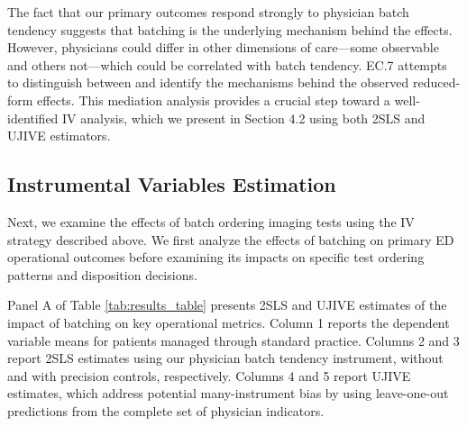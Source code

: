 \documentclass[,,blindrev]{informs}
\begin{document}
The fact that our primary outcomes respond strongly to physician batch
tendency suggests that batching is the underlying mechanism behind the
effects. However, physicians could differ in other dimensions of
care---some observable and others not---which could be correlated with
batch tendency. EC.7 attempts to distinguish between and identify the
mechanisms behind the observed reduced-form effects. This mediation
analysis provides a crucial step toward a well-identified IV analysis,
which we present in Section 4.2 using both 2SLS and UJIVE estimators.

\subsection{Instrumental Variables Estimation}\label{sec:iv_results}

Next, we examine the effects of batch ordering imaging tests using the
IV strategy described above. We first analyze the effects of batching on
primary ED operational outcomes before examining its impacts on specific
test ordering patterns and disposition decisions.

Panel A of Table \ref{tab:results_table} presents 2SLS and UJIVE
estimates of the impact of batching on key operational metrics. Column 1
reports the dependent variable means for patients managed through
standard practice. Columns 2 and 3 report 2SLS estimates using our
physician batch tendency instrument, without and with precision
controls, respectively. Columns 4 and 5 report UJIVE estimates, which
address potential many-instrument bias by using leave-one-out
predictions from the complete set of physician indicators.
\end{document}
